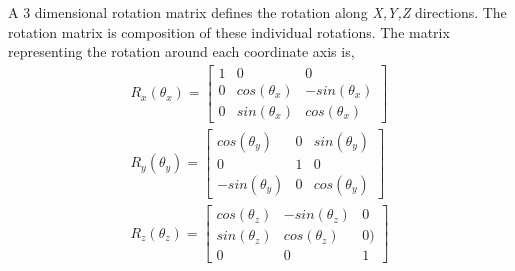 A 3 dimensional rotation matrix defines the rotation along \emph{X,Y,Z} directions. The rotation matrix is composition of these individual rotations. The matrix representing the rotation around each coordinate axis is,
\begin{equation}
	\begin{split}
	R_x(\theta_x) = 
	\begin{bmatrix}
	1 &0 &0 \\ 0 &cos(\theta_x) &-sin(\theta_x)\\ 0 &sin(\theta_x) &cos(\theta_x)
	\end{bmatrix}\\
	R_y(\theta_y) = 
	\begin{bmatrix}
	cos(\theta_y) &0 &sin(\theta_y) \\ 0 &1 &0\\ -sin(\theta_y) &0 &cos(\theta_y)
	\end{bmatrix}\\
	R_z(\theta_z) = 
	\begin{bmatrix}
	cos(\theta_z) &-sin(\theta_z) &0 \\ sin(\theta_z) &cos(\theta_z) &0)\\ 0 &0 &1
	\end{bmatrix}
	\end{split}
\end{equation}
